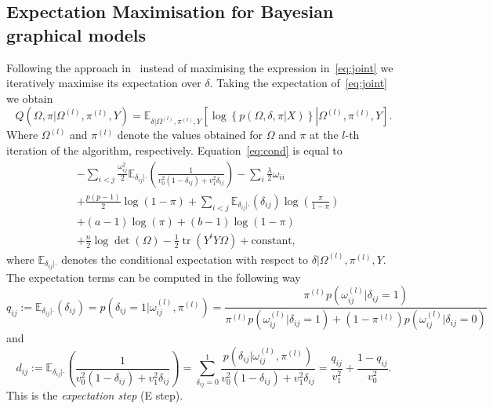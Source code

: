 \documentclass{scrartcl}
\DeclareMathOperator{\tr}{tr}
\newcommand{\E}{\mathbb{E}}
\newcommand{\1}{\mathds{1}}
\newcommand{\powl}{^{(l)}}
\begin{document}
\subsection{Expectation Maximisation for Bayesian graphical models}
Following the approach in~\cite{limcco-2017} instead of maximising the
expression in~\eqref{eq:joint} we iteratively maximise its expectation
over $\delta$. Taking the expectation of~\eqref{eq:joint} we obtain
\begin{equation}\label{eq:cond}
	Q(\Omega, \pi| \Omega\powl, \pi\powl, Y) = \mathbb{E}_{\delta|\Omega\powl, \pi\powl, Y}\left[\log\left\{p(\Omega, \delta, \pi| X)\right\}\left|  \Omega\powl, \pi\powl, Y\right.\right].
\end{equation}
Where $\Omega\powl$ and $\pi\powl$ denote the values obtained for $\Omega$ and $\pi$ at the $l$-th iteration of the algorithm, respectively. Equation~\eqref{eq:cond} is equal to
\begin{align*}
	 & - \sum_{i<j} \frac{\omega_{ij}^2}{2} \E_{\delta_{ij} |
		\cdot}\left(\frac{1}{v_0^2 (1 - \delta_{ij}) + v_1^2 \delta_{ij}}\right) -
	\sum_i \frac{\lambda}{2} \omega_{ii}
	\\
	 & + \frac{p(p-1)}{2}  \log(1 - \pi) + \sum_{i<j} \E_{\delta_{ij} |
		\cdot}(\delta_{ij}) \log\left(\frac{\pi}{1-\pi}\right)
	\\
	 & + (a - 1) \log(\pi) + (b - 1) \log(1 - \pi)
	\\
	 & + \frac{n}{2} \log\det(\Omega) - \frac{1}{2} \tr(Y^t Y \Omega) +
	\text{constant,}
\end{align*}
where $\mathbb{E}_{\delta_{ij} | \cdot}$ denotes the conditional expectation with respect
to $\delta|\Omega\powl, \pi\powl, Y.$
The expectation terms can be computed in the following way
\begin{equation}\label{eq:qij}
	q_{ij} := \E_{\delta_{ij} | \cdot}(\delta_{ij}) = p(\delta_{ij} = 1 | \omega_{ij}\powl, \pi\powl)
	= \frac{ \pi\powl p(\omega_{ij}\powl | \delta_{ij} = 1)}{\pi\powl p(\omega_{ij}\powl | \delta_{ij} = 1) +
		(1 - \pi\powl) p(\omega_{ij}\powl | \delta_{ij} = 0)}
\end{equation}
and
\begin{equation}\label{eq:dij}
	d_{ij} := \E_{\delta_{ij} | \cdot}\left(\frac{1}{v_0^2 (1 -
			\delta_{ij}) + v_1^2 \delta_{ij}}\right) = \sum_{\delta_{ij} = 0}^1
	\frac{p(\delta_{ij} | \omega_{ij}\powl, \pi\powl)}{v_0^2 (1 - \delta_{ij}) +
		v_1^2 \delta_{ij}} = \frac{q_{ij}}{v_1^2} + \frac{1 - q_{ij}}{v_0^2}.
\end{equation}
This is the \emph{expectation step} (E step).
\end{document}
